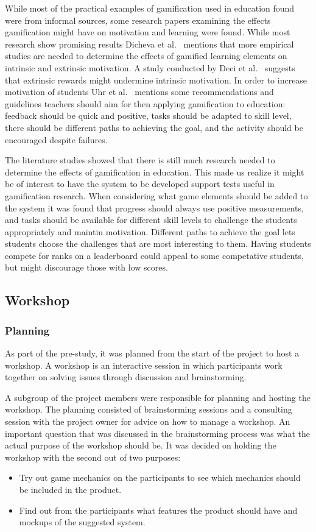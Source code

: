 While most of the practical examples of gamification used in education found were from informal sources, some research papers examining the effects gamification might have on motivation and learning were found. While most research show promising results Dicheva et al.~\cite{ref:dicheva} mentions that more empirical studies are needed to determine the effects of gamified learning elements on intrinsic and extrinsic motivation. A study conducted by Deci et al.~\cite{ref:deci} suggests that extrinsic rewards might undermine intrinsic motivation. In order to increase motivation of students Uhr et al.~\cite{ref:uhr} mentions some recommendations and guidelines teachers should aim for then applying gamification to education: feedback should be quick and positive, tasks should be adapted to skill level, there should be different paths to achieving the goal, and the activity should be encouraged despite failures.

The literature studies showed that there is still much research needed to determine the effects of gamification in education. This made us realize it might be of interest to have the system to be developed support tests useful in gamification research. When considering what game elements should be added to the system it was found that progress should always use positive measurements, and tasks should be available for different skill levels to challenge the students appropriately and maintin motivation. Different paths to achieve the goal lets students choose the challenges that are most interesting to them. Having students compete for ranks on a leaderboard could appeal to some competative students, but might discourage those with low scores.

\subsection{Workshop}
\subsubsection{Planning}
As part of the pre-study, it was planned from the start of the project to host a workshop. A workshop is an interactive session in which participants work together on solving issues through discussion and brainstorming\cite{workshop}. 

A subgroup of the project members were responsible for planning and hosting the workshop. The planning consisted of brainstorming sessions and a consulting session with the project owner for advice on how to manage a workshop. An important question that was discussed in the brainstorming process was what the actual purpose of the workshop should be. It was decided on holding the workshop with the second out of two purposes:
\begin{itemize}  
    \item Try out game mechanics on the participants to see which mechanics should be included in the product.
    \item Find out from the participants what features the product should have and mockups of the suggested system. 
\end{itemize}

